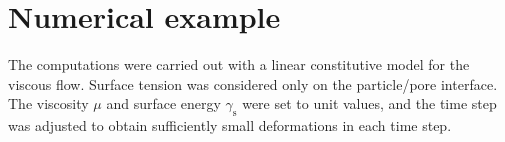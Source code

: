 \documentclass[10pt,a4paper,fleqn]{article}
\newcommand{\surf}{\mathrm{s}}
\begin{document}
\section{Numerical example}\label{sec:examples}

The computations were carried out with a linear constitutive model for the viscous flow. Surface tension was considered only on the particle/pore interface. The viscosity $\mu$ and surface energy $\gamma_\surf$ were set to unit values, and the time step was adjusted to obtain sufficiently small deformations in each time step.
%
\begin{figure}[thpb!]
    \centering
    \hspace{1em}

\end{figure}
\end{document}
